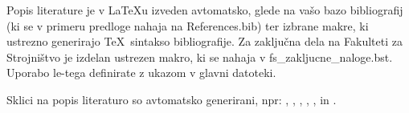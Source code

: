 Popis literature je v \LaTeX u izveden avtomatsko, glede na vašo bazo 
bibliografij (ki se v primeru predloge nahaja na References.bib) ter izbrane 
makre, ki ustrezno generirajo \TeX~sintakso bibliografije. Za zaključna dela na 
Fakulteti za Strojništvo je izdelan ustrezen makro, ki se nahaja v 
fs\_zakljucne\_naloge.bst. Uporabo le-tega definirate z ukazom 
\verb|| v glavni datoteki.

Sklici na popis literaturo so avtomatsko generirani, npr: \cite{bazant_1991}, 
\cite{Doe_1991},  \cite{Bazant_2008}, \cite{Gonzalez_2014, Bazant_2005} 
\cite{Bazant_2007, Kogoj_DTD, Merkur_2005, SURS_2009, SURS_2005, MKariera, 
	Encyclopedia, Posl_app, ZGD, ZOP}, \cite{ISO_2573}, \cite{DIN_4768} in 
\cite{JISB0601, Novak_2015}.






